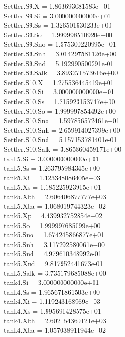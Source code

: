 Settler.S9.X = 1.863693081583e+01\\
Settler.S9.Si = 3.000000000000e+01\\
Settler.S9.Ss = 1.326501630233e+00\\
Settler.S9.So = 1.999998510920e+00\\
Settler.S9.Sno = 1.575300220995e+01\\
Settler.S9.Snh = 3.014297581126e+00\\
Settler.S9.Snd = 5.192990500291e-01\\
Settler.S9.Salk = 3.893271573616e+00\\
Settler.S10.X = 1.275536445419e+01\\
Settler.S10.Si = 3.000000000000e+01\\
Settler.S10.Ss = 1.315923153747e+00\\
Settler.S10.So = 1.999997854492e+00\\
Settler.S10.Sno = 1.597856572461e+01\\
Settler.S10.Snh = 2.659914027399e+00\\
Settler.S10.Snd = 5.157153781401e-01\\
Settler.S10.Salk = 3.865860459171e+00\\
tank5.Si = 3.000000000000e+01\\
tank5.Ss = 1.263795984345e+00\\
tank5.Xi = 1.123348086405e+03\\
tank5.Xs = 1.185225923915e+01\\
tank5.Xbh = 2.606406877777e+03\\
tank5.Xba = 1.068019744323e+02\\
tank5.Xp = 4.439932752854e+02\\
tank5.So = 1.999997685099e+00\\
tank5.Sno = 1.674245866877e+01\\
tank5.Snh = 3.117292580061e+00\\
tank5.Snd = 4.979610348992e-01\\
tank5.Xnd = 9.817952441673e-01\\
tank5.Salk = 3.735179685088e+00\\
tank4.Si = 3.000000000000e+01\\
tank4.Ss = 1.965671861503e+00\\
tank4.Xi = 1.119243168969e+03\\
tank4.Xs = 1.995691428575e+01\\
tank4.Xbh = 2.602154360121e+03\\
tank4.Xba = 1.057038911944e+02\\
